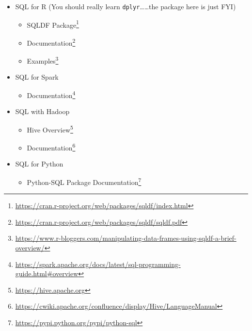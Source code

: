 \documentclass[]{book}
\providecommand{\tightlist}{%
  \setlength{\itemsep}{0pt}\setlength{\parskip}{0pt}}
\renewcommand{\href}[2]{#2\footnote{\url{#1}}}
\theoremstyle{definition}
\theoremstyle{definition}
\theoremstyle{remark}
\begin{document}
\begin{itemize}
\tightlist
\item
  SQL for R (You should really learn \texttt{dplyr}\ldots{}\ldots{}the
  package here is just FYI)

  \begin{itemize}
  \tightlist
  \item
    \href{https://cran.r-project.org/web/packages/sqldf/index.html}{SQLDF
    Package}
  \item
    \href{https://cran.r-project.org/web/packages/sqldf/sqldf.pdf}{Documentation}
  \item
    \href{https://www.r-bloggers.com/manipulating-data-frames-using-sqldf-a-brief-overview/}{Examples}
  \end{itemize}
\item
  SQL for Spark

  \begin{itemize}
  \tightlist
  \item
    \href{https://spark.apache.org/docs/latest/sql-programming-guide.html\#overview}{Documentation}
  \end{itemize}
\item
  SQL with Hadoop

  \begin{itemize}
  \tightlist
  \item
    \href{https://hive.apache.org}{Hive Overview}
  \item
    \href{https://cwiki.apache.org/confluence/display/Hive/LanguageManual}{Documentation}
  \end{itemize}
\item
  SQL for Python

  \begin{itemize}
  \tightlist
  \item
    \href{https://pypi.python.org/pypi/python-sql}{Python-SQL Package
    Documentation}
  \end{itemize}
\end{itemize}



\backmatter
\printindex
\end{document}
